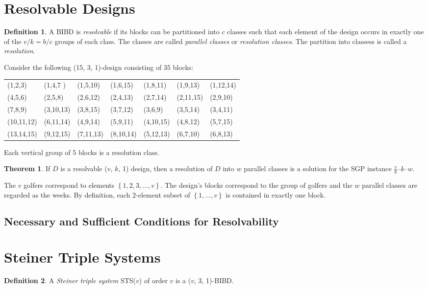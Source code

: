 \documentclass[12pt]{article}
\theoremstyle{definition}
\newtheorem{thm}{Theorem}[section]
\newtheorem{mydef}{Definition}
\begin{document}
\section{Resolvable Designs}
\begin{mydef}
A BIBD is \textit{resolvable} if its blocks can be partitioned into $c$ classes such that each element of the design occurs in exactly one of the $v/k = b/c$ groups of each class. The classes are called \textit{parallel classes} or \textit{resolution classes}. The partition into classess is called a \textit{resolution}. \cite{Triska}
\end{mydef}
Consider the following (15, 3, 1)-design consisting of 35 blocks:
\begin{center}
\begin{tabular}{lllllll} 
(1,2,3) & (1,4,7 ) & (1,5,10) & (1,6,15) & (1,8,11) &  (1,9,13) & (1,12,14) \\
(4,5,6) & (2,5,8) & (2,6,12) & (2,4,13) &  (2,7,14) & (2,11,15) & (2,9,10) \\
(7,8,9) & (3,10,13) & (3,8,15) & (3,7,12) &  (3,6,9) & (3,5,14) & (3,4,11) \\
(10,11,12) & (6,11,14) & (4,9,14) & (5,9,11) &  (4,10,15) & (4,8,12) & (5,7,15) \\
(13,14,15) & (9,12,15) & (7,11,13) & (8,10,14) &  (5,12,13) & (6,7,10) & (6,8,13)
\end{tabular}
\end{center}

\begin{center}
Each vertical group of 5 blocks is a resolution class.
\end{center}
\begin{thm}
If $D$ is a resolvable ($v$, $k$, 1) design, then a resolution of $D$ into $w$ parallel classes is a solution for the SGP instance $\frac{v}{k}$--$k$--$w$. \cite{Triska}
\end{thm}
The $v$ golfers correspond to elements $\left\{1, 2, 3, ...,v\right\}$. The design's blocks correspond to the group of golfers and the $w$ parallel classes are regarded as the weeks. By definition, each 2-element subset of $\left\{1, ...,v\right\}$ is contained in exactly one block. \cite{Triska}

\subsection{Necessary and Sufficient Conditions for Resolvability}

\section{Steiner Triple Systems}
\begin{mydef}
A \textit{Steiner triple system} STS($v$) of order $v$ is a ($v$, 3, 1)-BIBD.
\end{mydef}

\clearpage


{}

\end{document}
